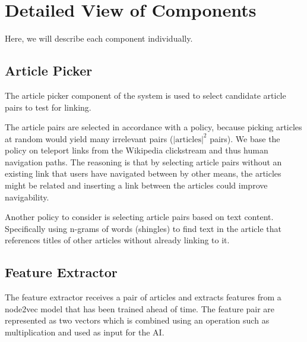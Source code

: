 \section{Detailed View of Components}\label{sec:detailed_view}

Here, we will describe each component individually. 

\subsection{Article Picker}
The article picker component of the system is used to select candidate article pairs to test for linking.

The article pairs are selected in accordance with a policy, because picking articles at random would yield many irrelevant pairs ($\left\vert{\text{articles}}\right\vert ^{2}$ pairs). We base the policy on teleport links from the Wikipedia clickstream and thus human navigation paths. The reasoning is that by selecting article pairs without an existing link that users have navigated between by other means, the articles might be related and inserting a link between the articles could improve navigability. 

Another policy to consider is selecting article pairs based on text content. Specifically using n-grams of words (shingles) to find text in the article that references titles of other articles without already linking to it. 


\subsection{Feature Extractor}
The feature extractor receives a pair of articles and extracts features from a node2vec model that has been trained ahead of time. The feature pair are represented as two vectors which is combined using an operation such as multiplication  and used as input for the AI.